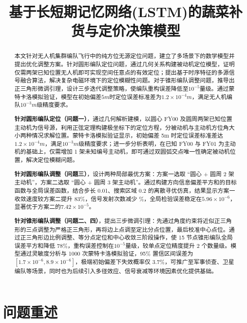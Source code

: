 \documentclass[withoutpreface,bwprint]{cumcmthesis} %
\title{基于长短期记忆网络(LSTM)的蔬菜补货与定价决策模型}
\begin{document}
\maketitle
\nocite{*}


\begin{abstract}
本文针对无人机集群编队飞行中的纯方位无源定位问题，建立了多场景下的数学模型并提出优化调整方案。针对圆形编队定位问题，通过几何关系构建被动机定位模型，证明仅需两架已知位置无人机即可实现空间任意点的有效定位；提出基于时序特征的多源信号融合算法，解决复杂电磁环境下的定位模糊性问题。对于锥形编队调整问题，推导出正三角形微调引理，设计三步迭代调整策略，使编队重构误差降低至$10^{−5}$量级。通过蒙特卡洛模拟验证，模型在初始偏差$5m$时定位误差标准差为$1.2×10^{−4}m$，满足无人机编队$10^{−3}m$级精度要求。

    \textbf{针对圆形编队定位（问题一）}，通过几何解析建模，以圆心 FY00 及圆周两架已知位置主动机为信号源，利用正弦定理构建极坐标下的定位方程，分被动机与主动机方位角大小两种情况求解位置。蒙特卡洛模拟验证显示，初始偏差 5m 时定位误差标准差达\(1.2×10^{−4}m\)，满足\(10^{−3}m\)级精度要求；进一步分析表明，在已知 FY00 与 FY01 为主动机的基础上，仅需增加 1 架未知编号主动机，即可通过双圆弧交点唯一性确定被动机位置，解决定位模糊问题。

    \textbf{针对圆形编队调整（问题三）}，设计两种局部最优方案：方案一选取 “圆心 + 圆周 2 架主动机”，方案二选取 “圆心 + 圆周 3 架主动机”。通过构建方向信息偏差平方和的目标函数与全局误差函数，结合步长 0.01、搜索区域 0.2 的离散寻优仿真，结果显示方案一收敛速度较方案二提升 83\%，信号发射次数减少 \%，全局检验误差稳定在\(5.96×10^{−6}\)，显著优于方案二的\(7.42×10^{−5}\)。

    \textbf{针对锥形编队调整（问题二、四）}，提出三步微调引理：先通过角度约束将近似正三角形的三点调整为严格正三角形，再将边上点调至定比分点位置，最后校准中心点位。通过正三角形边比例调整、等分点定位和中心收敛三阶段操作，使 15 节点锥形编队全局误差平方和降低 78\%，重构误差控制在\(10^{−5}\)量级，较单点定位精度提升 2 个数量级。模型通过灵敏度分析与 1000 次蒙特卡洛模拟验证，95\% 置信区间误差为\([1.7×10^{−6},8.9×10^{−6}]\)，极端初始偏差下失效概率仅 3.7\%，可推广至军事侦查、卫星编队等场景，同时也为后续引入多径效应、信号衰减等环境因素优化提供基础。
\end{abstract}

\section{问题重述}
\end{document}
